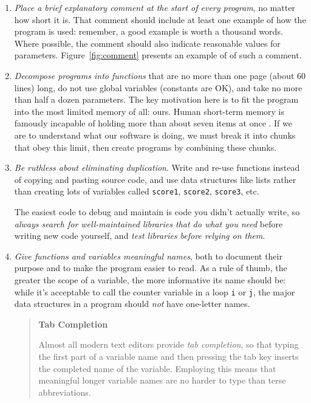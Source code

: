 \documentclass[10pt]{article}
\newcommand{\recommend}[1]{\textit{#1}}
\begin{document}
\begin{enumerate}

\item
  \recommend{Place a brief explanatory comment at the start of every
    program}, no matter how short it is. That comment should include
  at least one example of how the program is used: remember, a good
  example is worth a thousand words. Where possible, the comment
  should also indicate reasonable values for parameters.
  Figure~\ref{fig:comment} presents an example of of such a comment.

\item
  \recommend{Decompose programs into functions} that are no more than
  one page (about 60 lines) long, do not
  use global variables (constants are OK), and take no more than half
  a dozen parameters.  The key motivation here is to fit the program
  into the most limited memory of all: ours. Human short-term memory
  is famously incapable of holding more than about seven items at
  once \cite{miller1956}. If we are to understand
  what our software is doing, we must break it into chunks that obey
  this limit, then create programs by combining these chunks.

\item
  \recommend{Be ruthless about eliminating duplication}. Write and
  re-use functions instead of copying and pasting source code, and use
  data structures like lists rather than creating lots of variables
  called \texttt{score1}, \texttt{score2}, \texttt{score3}, etc.

  The easiest code to debug and maintain is code you didn't
  actually write, so \recommend{always search for well-maintained
    libraries that do what you need} before writing new code yourself,
  and \recommend{test libraries before relying on them}.

\item
  \recommend{Give functions and variables meaningful names}, both to
  document their purpose and to make the program easier to read. As a
  rule of thumb, the greater the scope of a variable, the more
  informative its name should be: while it's acceptable to call the
  counter variable in a loop \texttt{i} or \texttt{j}, the major data
  structures in a program should \emph{not} have one-letter names.

  \begin{quote}
    \noindent \textbf{Tab Completion}

    Almost all modern text editors provide \emph{tab completion}, so
    that typing the first part of a variable name and then pressing
    the tab key inserts the completed name of the variable.  Employing
    this means that meaningful longer variable names are no harder to type
    than terse abbreviations.


\end{quote}
\end{enumerate}
\end{document}
